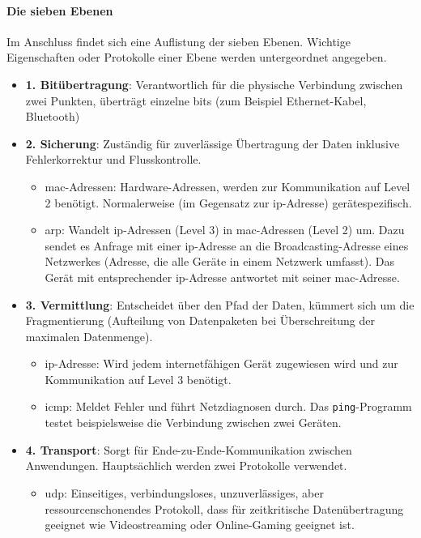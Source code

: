 \documentclass[11pt, a4paper]{article}
\begin{document}
\paragraph{Die sieben Ebenen}
Im Anschluss findet sich eine Auflistung der sieben Ebenen. Wichtige Eigenschaften oder Protokolle einer Ebene werden untergeordnet angegeben.
\begin{itemize}
	\item \textbf{1. Bitübertragung}: Verantwortlich für die physische Verbindung zwischen zwei Punkten, überträgt einzelne \glspl{bit} (zum Beispiel Ethernet-Kabel, Bluetooth)
	\item \textbf{2. Sicherung}: Zuständig für zuverlässige Übertragung der Daten inklusive Fehlerkorrektur und Flusskontrolle.
	\begin{itemize}
		\item \gls{mac}-Adressen: Hardware-Adressen, werden zur Kommunikation auf Level 2 benötigt. Normalerweise (im Gegensatz zur \gls{ip}-Adresse) gerätespezifisch.
		\item \gls{arp}: Wandelt \gls{ip}-Adressen (Level 3) in \gls{mac}-Adressen (Level 2) um. Dazu sendet es Anfrage mit einer \gls{ip}-Adresse an die Broadcasting-Adresse eines Netzwerkes (Adresse, die alle Geräte in einem Netzwerk umfasst). Das Gerät mit entsprechender \gls{ip}-Adresse antwortet mit seiner \gls{mac}-Adresse.
	\end{itemize}
	\item \textbf{3. Vermittlung}: Entscheidet über den Pfad der Daten, kümmert sich um die Fragmentierung (Aufteilung von Datenpaketen bei Überschreitung der maximalen Datenmenge).
	\begin{itemize}
		\item \gls{ip}-Adresse: Wird jedem internetfähigen Gerät zugewiesen wird und zur Kommunikation auf Level 3 benötigt.
		\item \gls{icmp}: Meldet Fehler und führt Netzdiagnosen durch. Das \texttt{ping}-Programm testet beispielsweise die Verbindung zwischen zwei Geräten.~\cite{ICMPFortinet:online}
	\end{itemize}
	\item \textbf{4. Transport}: Sorgt für Ende-zu-Ende-Kommunikation zwischen Anwendungen. Hauptsächlich werden zwei Protokolle verwendet.
	\begin{itemize}
		\item \gls{udp}: Einseitiges, verbindungsloses, unzuverlässiges, aber ressourcenschonendes Protokoll, dass für zeitkritische Datenübertragung geeignet wie Videostreaming oder Online-Gaming geeignet ist.

\end{itemize}
\end{itemize}
\end{document}
